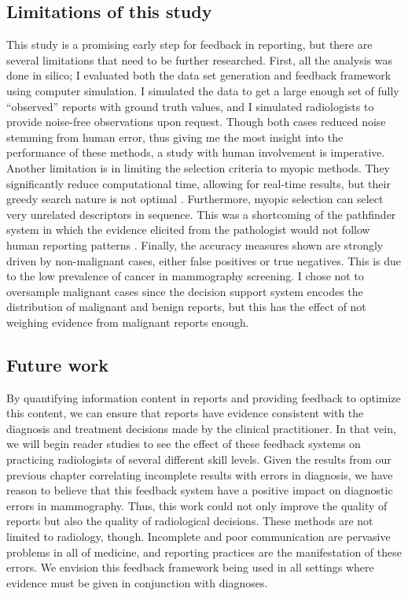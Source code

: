 \subsection{Limitations of this study}
This study is a promising early step for feedback in reporting, but there are several limitations that need to be further researched.
First, all the analysis was done in silico; I evaluated both the data set generation and feedback framework using computer simulation.
I simulated the data to get a large enough set of fully ``observed'' reports with ground truth values, and I simulated radiologists to provide noise-free observations upon request.
Though both cases reduced noise stemming from human error, thus giving me the most insight into the performance of these methods, a study with human involvement is imperative.
Another limitation is in limiting the selection criteria to myopic methods.
They significantly reduce computational time, allowing for real-time results, but their greedy search nature is not optimal \cite{Nemhauser:1978ck}.
Furthermore, myopic selection can select very unrelated descriptors in sequence.
This was a shortcoming of the pathfinder system in which the evidence elicited from the pathologist would not follow human reporting patterns \cite{Heckerman:1992ud}.
Finally, the accuracy measures shown are strongly driven by non-malignant cases, either false positives or true negatives.
This is due to the low prevalence of cancer in mammography screening.
I chose not to oversample malignant cases since the decision support system encodes the distribution of malignant and benign reports, but this has the effect of not weighing evidence from malignant reports enough.


\subsection{Future work}
By quantifying information content in reports and providing feedback to optimize this content, we can ensure that reports have evidence consistent with the diagnosis and treatment decisions made by the clinical practitioner.
In that vein, we will begin reader studies to see the effect of these feedback systems on practicing radiologists of several different skill levels.
Given the results from our previous chapter correlating incomplete results with errors in diagnosis, we have reason to believe that this feedback system have a positive impact on diagnostic errors in mammography.
Thus, this work could not only improve the quality of reports but also the quality of radiological decisions.
These methods are not limited to radiology, though.
Incomplete and poor communication are pervasive problems in all of medicine, and reporting practices are the manifestation of these errors.
We envision this feedback framework being used in all settings where evidence must be given in conjunction with diagnoses.

 
 



 
